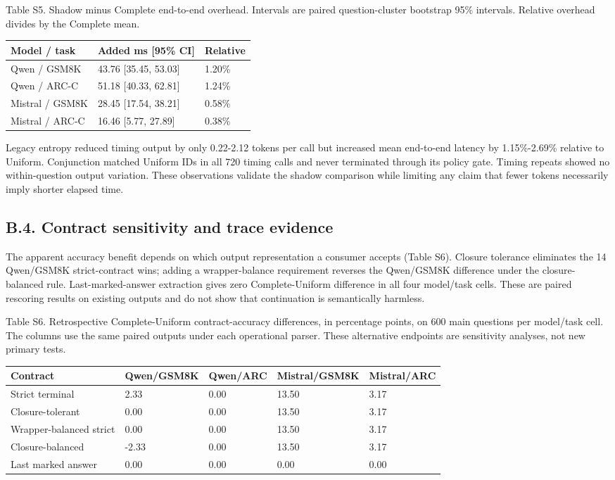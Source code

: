 \documentclass[
  12pt,
  a4paper,
]{article}
\begin{document}
Table S5. Shadow minus Complete end-to-end overhead. Intervals are
paired question-cluster bootstrap 95\% intervals. Relative overhead
divides by the Complete mean.

\begin{longtable}[]{@{}lll@{}}
\toprule\noalign{}
Model / task & Added ms {[}95\% CI{]} & Relative \\
\midrule\noalign{}
\endhead
\bottomrule\noalign{}
\endlastfoot
Qwen / GSM8K & 43.76 {[}35.45, 53.03{]} & 1.20\% \\
Qwen / ARC-C & 51.18 {[}40.33, 62.81{]} & 1.24\% \\
Mistral / GSM8K & 28.45 {[}17.54, 38.21{]} & 0.58\% \\
Mistral / ARC-C & 16.46 {[}5.77, 27.89{]} & 0.38\% \\
\end{longtable}

Legacy entropy reduced timing output by only 0.22-2.12 tokens per call
but increased mean end-to-end latency by 1.15\%-2.69\% relative to
Uniform. Conjunction matched Uniform IDs in all 720 timing calls and
never terminated through its policy gate. Timing repeats showed no
within-question output variation. These observations validate the shadow
comparison while limiting any claim that fewer tokens necessarily imply
shorter elapsed time.

\subsection{B.4. Contract sensitivity and trace
evidence}\label{b.4.-contract-sensitivity-and-trace-evidence}

The apparent accuracy benefit depends on which output representation a
consumer accepts (Table S6). Closure tolerance eliminates the 14
Qwen/GSM8K strict-contract wins; adding a wrapper-balance requirement
reverses the Qwen/GSM8K difference under the closure-balanced rule.
Last-marked-answer extraction gives zero Complete-Uniform difference in
all four model/task cells. These are paired rescoring results on
existing outputs and do not show that continuation is semantically
harmless.

Table S6. Retrospective Complete-Uniform contract-accuracy differences,
in percentage points, on 600 main questions per model/task cell. The
columns use the same paired outputs under each operational parser. These
alternative endpoints are sensitivity analyses, not new primary tests.

\begin{longtable}[]{@{}lllll@{}}
\toprule\noalign{}
Contract & Qwen/GSM8K & Qwen/ARC & Mistral/GSM8K & Mistral/ARC \\
\midrule\noalign{}
\endhead
\bottomrule\noalign{}
\endlastfoot
Strict terminal & 2.33 & 0.00 & 13.50 & 3.17 \\
Closure-tolerant & 0.00 & 0.00 & 13.50 & 3.17 \\
Wrapper-balanced strict & 0.00 & 0.00 & 13.50 & 3.17 \\
Closure-balanced & -2.33 & 0.00 & 13.50 & 3.17 \\
Last marked answer & 0.00 & 0.00 & 0.00 & 0.00 \\
\end{longtable}
\end{document}
